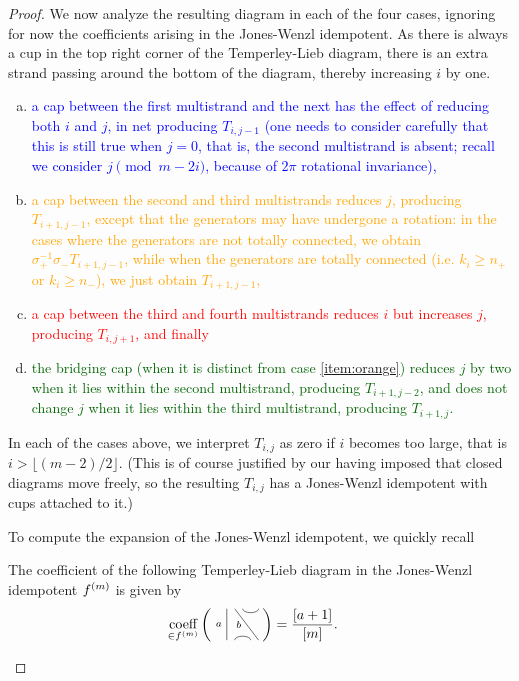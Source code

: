 \documentclass[12pt]{article}
\begin{document}
\begin{proof}
We now analyze the resulting diagram in each of the four cases, ignoring for now the coefficients arising in the Jones-Wenzl idempotent. As there is always a cup in the top right corner of the Temperley-Lieb diagram, there is an extra strand passing around the bottom of the diagram, thereby increasing $i$ by one.
\begin{enumerate}[(a)]
\item
\textcolor{blue}{
a cap between the first multistrand and the next has the effect of reducing both $i$ and $j$, in net producing $T_{i,j-1}$ (one needs to consider carefully that this is still true when $j=0$, that is, the second multistrand is absent; recall we consider $j \pmod{m-2i}$, because of $2\pi$ rotational invariance),
}
\item
\textcolor{orange}{
a cap between the second and third multistrands reduces $j$, producing $T_{i+1, j-1}$, except that the generators may have undergone a rotation: in the cases where the generators are not totally connected, we obtain $\sigma_+^{-1} \sigma_- T_{i+1, j-1}$, while when the generators are totally connected (i.e. $k_i \geq n_+$ or $k_i \geq   n_-$), we just obtain $T_{i+1,j-1}$,
}
\item
\textcolor{red}{
a cap between the third and fourth multistrands reduces $i$ but increases $j$, producing $T_{i, j+1}$, and finally
}
\item
\textcolor{DarkGreen}{
the bridging cap (when it is distinct from case \eqref{item:orange}) reduces $j$ by two when it lies within the second multistrand, producing $T_{i+1, j - 2}$, and does not change $j$ when it lies within the third multistrand, producing $T_{i+1, j}$. 
}
\end{enumerate}

In each of the cases above, we interpret $T_{i,j}$ as zero if $i$ becomes too large, that is $i > \lfloor (m-2)/2 \rfloor$. (This is of course justified by our having imposed that closed diagrams move freely, so the resulting $T_{i,j}$ has a Jones-Wenzl idempotent with cups attached to it.)

To compute the expansion of the Jones-Wenzl idempotent, we quickly recall
\begin{lem}
The coefficient of the following Temperley-Lieb diagram in the Jones-Wenzl idempotent $f^{(m)}$ is given by
\begin{align*}
\underset{\in \jw{m}}{\textrm{coeff}}
\left(
\begin{tikzpicture}[baseline = -.1cm, yscale=-.5]
	\draw (-.5,-.8)--(-.5,.8);
	\draw (-.3,.8) arc (-180:0:.2cm);
	\draw (-.3,-.8)--(.3,.8);
	\draw (-.1,-.8) arc (180:0:.2cm);
	\node at (-.7,0) {{\scriptsize{$a$}}};
	\node at (-.2,0) {{\scriptsize{$b$}}};
    \node at (.2,0) {$\phantom{c}$};
\end{tikzpicture}
\right)
& =
\frac{[a+1]}{[m]}.
\end{align*}
\end{lem}
  

\end{proof}
\end{document}
